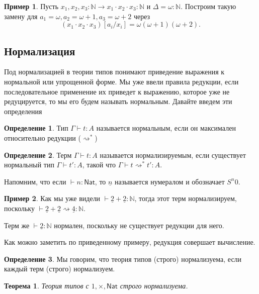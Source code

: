 \documentclass[openany]{book}
\theoremstyle{plain}
\newtheorem{thm}{Теорема}[section]
\theoremstyle{definition}
\newtheorem{defn}{Определение}[section]
\newtheorem{eg}{Пример}[]
\newcommand{\N}{\mathbb{N}}
\newcommand{\nat}{\mathsf{Nat}}
\begin{document}
\begin{eg}
Пусть \(x_1, x_2, x_3 : \N \to x_1 \cdot x_2 \cdot x_3 : \N\) и \(\Delta = \omega : \N\). Построим такую замену для \(a_1 = \omega, a_2 = \omega + 1, a_3 = \omega + 2\) через \[(x_1 \cdot x_2 \cdot x_3)[a_i/x_i] = \omega (\omega + 1)(\omega + 2).\]
\end{eg}

\subsection{Нормализация}

Под нормализацией в теории типов понимают приведение выражения к нормальной или упрощенной форме. Мы уже ввели правила редукции, если последовательное применение их приведет к выражению, которое уже не редуцируется, то мы его будем называть нормальным. Давайте введем эти определения
\begin{defn}
Тип \(\Gamma \vdash t: A\) называется нормальным, если он максимален относительно редукции (\(\rightsquigarrow^*\))
\end{defn}

\begin{defn}
Терм \(\Gamma \vdash t: A\) называется нормализируемым, если существует нормальный тип \(\Gamma \vdash t' : A\), такой что \(\Gamma \vdash t \rightsquigarrow^* t' : A\).
\end{defn}

Напомним, что если \(\vdash n : \nat\), то \(\underline{n}\) называется нумералом и обозначает \(S^n 0\).

\begin{eg}
Как мы уже видели \(\vdash \underline{2} + \underline{2} : \N\), тогда этот терм нормализируем, поскольку \(\vdash \underline{2} + \underline{2} \rightsquigarrow \underline{4} : \N\).

Терм же \(\vdash \underline{2} : \N\) нормален, поскольку не существует редукции для него.
\end{eg}

Как можно заметить по приведенному примеру, редукция совершает вычисление.

\begin{defn}
Мы говорим, что теория типов (строго) нормализуема, если каждый терм (строго) нормализуем.
\end{defn}

\begin{thm}
Теория типов с \(1, \times, \nat\) строго нормализуема.
\end{thm}
\end{document}

